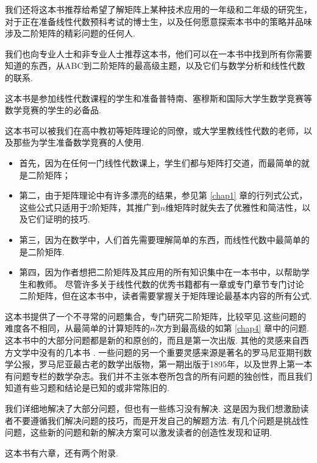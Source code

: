 我们还将这本书推荐给希望了解矩阵上某种技术应用的一年级和二年级的研究生，对于正在准备线性代数预科考试的博士生，以及任何愿意探索本书中的策略并品味涉及二阶矩阵的精彩问题的任何人.

我们也向专业人士和非专业人士推荐这本书，他们可以在一本书中找到所有你需要知道的东西，从ABC到二阶矩阵的最高级主题，以及它们与数学分析和线性代数的联系.

这本书是参加线性代数课程的学生和准备普特南、塞穆斯和国际大学生数学竞赛等数学竞赛的学生的必备品.

这本书可以被我们在高中教初等矩阵理论的同僚，或大学里教线性代数的老师，以及那些为学生准备数学竞赛的人使用.

\begin{mybox}
  \begin{itemize}
    \item 首先，因为在任何一门线性代数课上，学生们都与矩阵打交道，而最简单的就是二阶矩阵；
    \item 第二，由于矩阵理论中有许多漂亮的结果，参见第 \ref{chap1} 章的行列式公式，这些公式只适用于2阶矩阵，其推广到$n$维矩阵时就失去了优雅性和简洁性，以及它们证明的技巧.
    \item 第三，因为在数学中，人们首先需要理解简单的东西，而线性代数中最简单的是二阶矩阵.
    \item 第四，因为作者想把二阶矩阵及其应用的所有知识集中在一本书中，以帮助学生和教师。 尽管许多关于线性代数的优秀书籍都有一章或专门章节专门讨论二阶矩阵，但在这本书中，读者需要掌握关于矩阵理论最基本内容的所有公式.
  \end{itemize}
\end{mybox}

这本书提供了一个不寻常的问题集合，专门研究二阶矩阵，比较罕见.这些问题的难度各不相同，从最简单的计算矩阵的$n$次方到最高级的如第 \ref{chap4} 章中的问题. 这本书中的大部分问题都是新的和原创的，而且是第一次出版. 其他的灵感来自西方文学中没有的几本书 \cite{47,48,50,51}. 一些问题的另一个重要灵感来源是著名的罗马尼亚期刊{\kaishu 数学公报}，罗马尼亚最古老的数学出版物，第一期出版于1895年，以及世界上第一本有问题专栏的数学杂志。我们并不主张本卷所包含的所有问题的独创性，而且我们知道有些习题和结论是已知的或非常陈旧的.

我们详细地解决了大部分问题，但也有一些练习没有解决. 这是因为我们想激励读者不要遵循我们解决问题的技巧，而是开发自己的解题方法. 有几个问题是挑战性问题，这些新的问题和新的解决方案可以激发读者的创造性发现和证明.


这本书有六章，还有两个附录.

